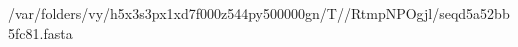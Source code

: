 \documentclass[10pt]{article}
\begin{document}
\begin{texshade}{/var/folders/vy/h5x3s3px1xd7f000z544py500000gn/T//RtmpNPOgjl/seqd5a52bb5fc81.fasta}
\hidelogoscale
{}
\showlegend
\end{texshade}
\end{document}

